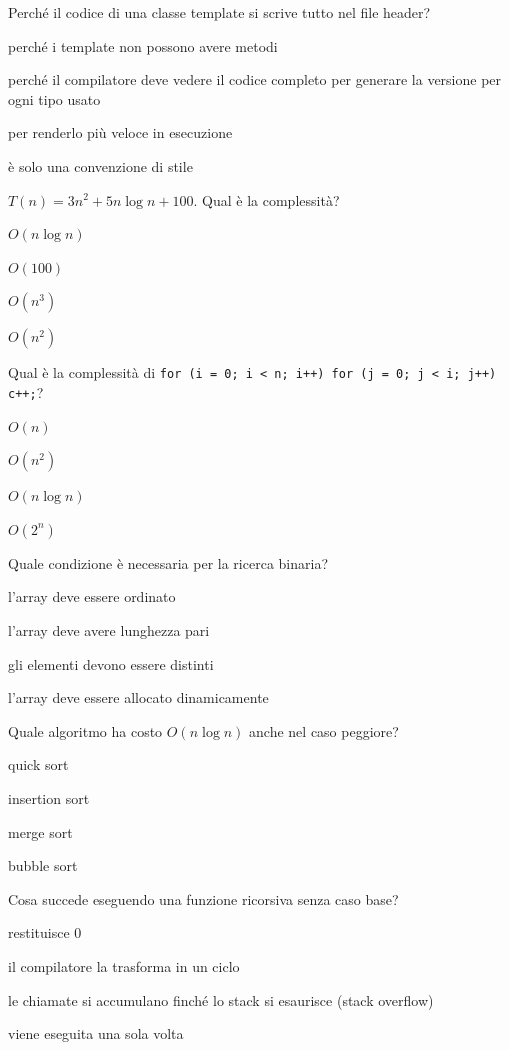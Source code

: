 \begin{quiz}{Perché il codice di una classe template si scrive tutto nel file header?}
  \item perché i template non possono avere metodi
  \item perché il compilatore deve vedere il codice completo per generare la versione per ogni tipo usato
  \item per renderlo più veloce in esecuzione
  \item è solo una convenzione di stile
\end{quiz}

\begin{quiz}{$T(n) = 3n^2 + 5n\log n + 100$. Qual è la complessità?}
  \item $O(n \log n)$
  \item $O(100)$
  \item $O(n^3)$
  \item $O(n^2)$
\end{quiz}

\begin{quiz}{Qual è la complessità di \texttt{for (i = 0; i < n; i++) for (j = 0; j < i; j++) c++;}?}
  \item $O(n)$
  \item $O(n^2)$
  \item $O(n \log n)$
  \item $O(2^n)$
\end{quiz}

\begin{quiz}{Quale condizione è necessaria per la ricerca binaria?}
  \item l'array deve essere ordinato
  \item l'array deve avere lunghezza pari
  \item gli elementi devono essere distinti
  \item l'array deve essere allocato dinamicamente
\end{quiz}

\begin{quiz}{Quale algoritmo ha costo $O(n \log n)$ anche nel caso peggiore?}
  \item quick sort
  \item insertion sort
  \item merge sort
  \item bubble sort
\end{quiz}

\begin{quiz}{Cosa succede eseguendo una funzione ricorsiva senza caso base?}
  \item restituisce 0
  \item il compilatore la trasforma in un ciclo
  \item le chiamate si accumulano finché lo stack si esaurisce (stack overflow)
  \item viene eseguita una sola volta
\end{quiz}

